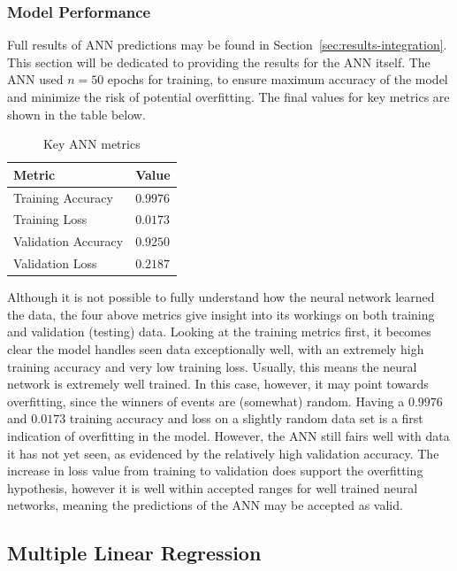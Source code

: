 \documentclass{mcmthesis}
\begin{document}
\subsubsection{Model Performance}

Full results of ANN predictions may be found in Section~\ref{sec:results-integration}. This section will be dedicated to providing the results for the ANN itself. The ANN used $n=50$ epochs for training, to ensure maximum accuracy of the model and minimize the risk of potential overfitting. The final values for key metrics are shown in the table below.

\begin{table}[H]
\caption{Key ANN metrics}
\centering
\vspace{5pt}
\begin{tabularx}{\textwidth} {
  >{\raggedright\arraybackslash}X 
  >{\raggedright\arraybackslash}X  }
\hline
 \textbf{Metric} & \textbf{Value} \\   
 \hline\hline
  Training Accuracy & $0.9976$\\ 
  Training Loss & $0.0173$\\
 Validation Accuracy & $0.9250$\\
 Validation Loss & $0.2187$\\ \hline
\end{tabularx}
\end{table}

Although it is not possible to fully understand how the neural network learned the data, the four above metrics give insight into its workings on both training and validation (testing) data. Looking at the training metrics first, it becomes clear the model handles seen data exceptionally well, with an extremely high training accuracy and very low training loss. Usually, this means the neural network is extremely well trained. In this case, however, it may point towards overfitting, since the winners of events are (somewhat) random. Having a $0.9976$ and $0.0173$ training accuracy and loss on a slightly random data set is a first indication of overfitting in the model. However, the ANN still fairs well with data it has not yet seen, as evidenced by the relatively high validation accuracy. The increase in loss value from training to validation does support the overfitting hypothesis, however it is well within accepted ranges for well trained neural networks, meaning the predictions of the ANN may be accepted as valid.

\subsection{Multiple Linear Regression}\label{sec:mlr}
\end{document}
